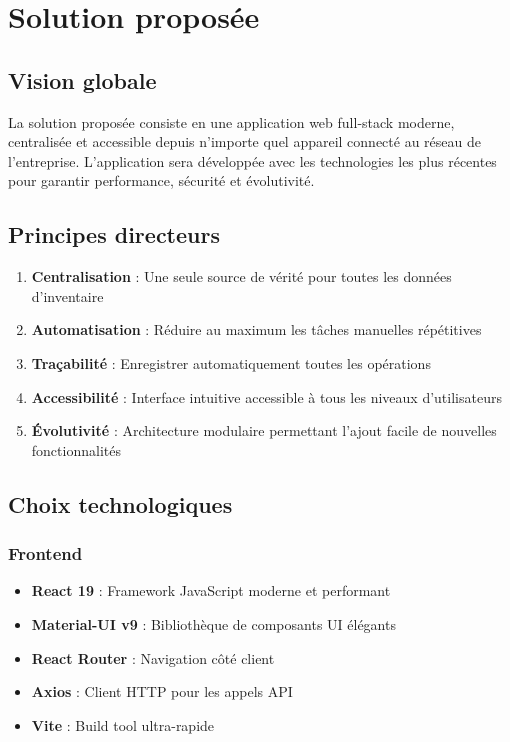 \documentclass[12pt,a4paper]{report}
\begin{document}
\section{Solution proposée}

\subsection{Vision globale}

La solution proposée consiste en une application web full-stack moderne, centralisée et accessible depuis n'importe quel appareil connecté au réseau de l'entreprise. L'application sera développée avec les technologies les plus récentes pour garantir performance, sécurité et évolutivité.

\subsection{Principes directeurs}

\begin{enumerate}
    \item \textbf{Centralisation} : Une seule source de vérité pour toutes les données d'inventaire
    
    \item \textbf{Automatisation} : Réduire au maximum les tâches manuelles répétitives
    
    \item \textbf{Traçabilité} : Enregistrer automatiquement toutes les opérations
    
    \item \textbf{Accessibilité} : Interface intuitive accessible à tous les niveaux d'utilisateurs
    
    \item \textbf{Évolutivité} : Architecture modulaire permettant l'ajout facile de nouvelles fonctionnalités
\end{enumerate}

\subsection{Choix technologiques}

\subsubsection{Frontend}

\begin{itemize}
    \item \textbf{React 19} : Framework JavaScript moderne et performant
    \item \textbf{Material-UI v9} : Bibliothèque de composants UI élégants
    \item \textbf{React Router} : Navigation côté client
    \item \textbf{Axios} : Client HTTP pour les appels API
    \item \textbf{Vite} : Build tool ultra-rapide
\end{itemize}
\end{document}
